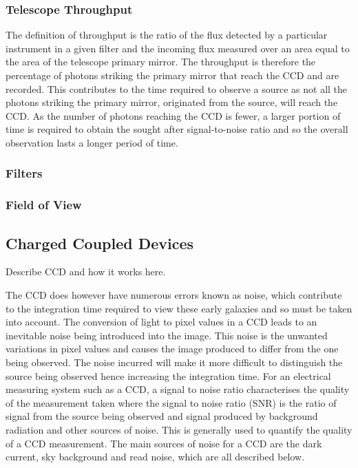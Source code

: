 		\subsubsection{Telescope Throughput} %
		\label{ssub:telescope_throughput}
			The definition of throughput is the ratio of the flux detected by a particular instrument in a given filter and the incoming flux measured over an area equal to the area of the telescope primary mirror\cite{WIRCam_Throughput}. The throughput is therefore the percentage of photons striking the primary mirror that reach the CCD and are recorded. This contributes to the time required to observe a source as not all the photons striking the primary mirror, originated from the source, will reach the CCD. As the number of photons reaching the CCD is fewer, a larger portion of time is required to obtain the sought after signal-to-noise ratio and so the overall observation lasts a longer period of time.

		\subsubsection{Filters}

		\subsubsection{Field of View}

	\subsection{Charged Coupled Devices} %
	\label{sub:charged_coupled_devices}
		Describe CCD and how it works here.

		The CCD does however have numerous errors known as noise, which contribute to the integration time required to view these early galaxies and so must be taken into account. The conversion of light to pixel values in a CCD leads to an inevitable noise being introduced into the image. This noise is the unwanted variations in pixel values and causes the image produced to differ from the one being observed. The noise incurred will make it more difficult to distinguish the source being observed hence increasing the integration time. For an electrical measuring system such as a CCD, a signal to noise ratio characterises the quality of the measurement taken where the signal to noise ratio (SNR) is the ratio of signal from the source being observed and signal produced by background radiation and other sources of noise. This is generally used to quantify the quality of a CCD measurement. The main sources of noise for a CCD are the dark current, sky background and read noise, which are all described below.

